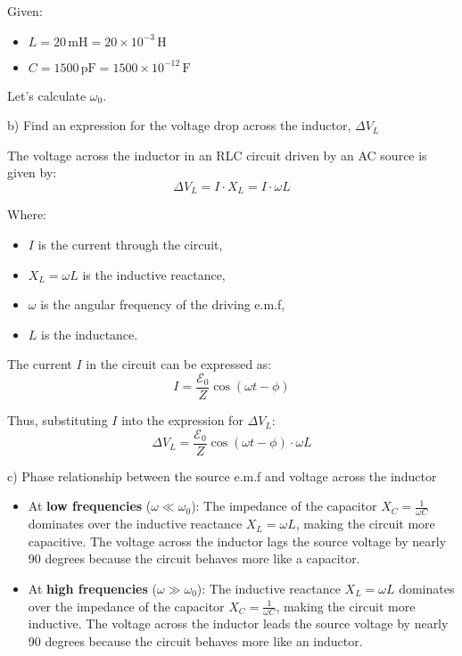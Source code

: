 \documentclass[a4paper,11pt]{article}
\begin{document}
Given:
\begin{itemize}
    \item \( L = 20 \, \text{mH} = 20 \times 10^{-3} \, \text{H} \)
    \item \( C = 1500 \, \text{pF} = 1500 \times 10^{-12} \, \text{F} \)
\end{itemize}

Let's calculate \( \omega_{0} \).

b) Find an expression for the voltage drop across the inductor, \( \Delta V_{L} \)

The voltage across the inductor in an RLC circuit driven by an AC source is given by:
\[ \Delta V_{L} = I \cdot X_{L} = I \cdot \omega L \]

Where:
\begin{itemize}
    \item \( I \) is the current through the circuit,
    \item \( X_{L} = \omega L \) is the inductive reactance,
    \item \( \omega \) is the angular frequency of the driving e.m.f,
    \item \( L \) is the inductance.
\end{itemize}

The current \( I \) in the circuit can be expressed as:
\[ I = \frac{\mathcal{E}_{0}}{Z} \cos(\omega t - \phi) \]

Thus, substituting \( I \) into the expression for \( \Delta V_{L} \):
\[ \Delta V_{L} = \frac{\mathcal{E}_{0}}{Z} \cos(\omega t - \phi) \cdot \omega L \]

c) Phase relationship between the source e.m.f and voltage across the inductor

\begin{itemize}
    \item At \textbf{low frequencies} (\( \omega \ll \omega_{0} \)):
    The impedance of the capacitor \( X_{C} = \frac{1}{\omega C} \) dominates over the inductive reactance \( X_{L} = \omega L \), making the circuit more capacitive. The voltage across the inductor lags the source voltage by nearly 90 degrees because the circuit behaves more like a capacitor.
    
    \item At \textbf{high frequencies} (\( \omega \gg \omega_{0} \)):
    The inductive reactance \( X_{L} = \omega L \) dominates over the impedance of the capacitor \( X_{C} = \frac{1}{\omega C} \), making the circuit more inductive. The voltage across the inductor leads the source voltage by nearly 90 degrees because the circuit behaves more like an inductor.
\end{itemize}
\end{document}

